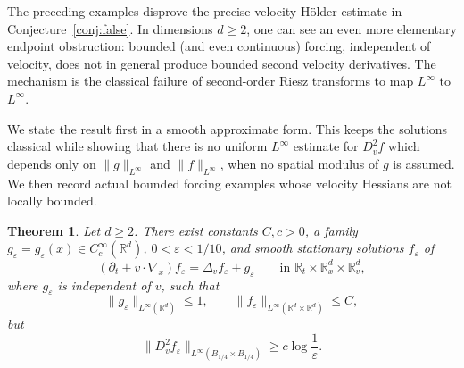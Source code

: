 \documentclass[10pt,a4paper]{amsart}
\numberwithin{equation}{section}
\newtheorem{theorem}{Theorem}[section]
\newcommand{\R}{\mathbb{R}}
\begin{document}
The preceding examples disprove the precise velocity H\"older estimate in
Conjecture~\ref{conj:false}.  In dimensions \(d\ge2\), one can see an even
more elementary endpoint obstruction: bounded {(and even continuous)} forcing, independent of
velocity, does not in general produce bounded second velocity derivatives.
The mechanism is the classical failure of second-order Riesz transforms to
map \(L^\infty\) to \(L^\infty\).

We state the result first in a smooth approximate form.  This keeps the
solutions classical while showing that {there is} no uniform \(L^\infty\) estimate for
\(D_v^2f\) {which depends} only on \(\|g\|_{L^\infty}\) and \(\|f\|_{L^\infty}\),
when no spatial modulus of \(g\) is assumed.  We then record actual bounded
forcing examples whose velocity Hessians are not locally bounded.


\begin{theorem}\label{prop:Linfty-endpoint-smooth}
Let \(d\ge2\).  There exist constants \(C,c>0\), a family
\(g_\varepsilon{=g_\varepsilon(x)}\in C_c^\infty(\R^d)\), \(0<\varepsilon<1/10\), and smooth
stationary solutions \(f_\varepsilon\) of
\begin{equation}\label{eq:Linfty-endpoint-equation}
   (\partial_t+v\cdot\nabla_x)f_\varepsilon
   =\Delta_v f_\varepsilon+g_\varepsilon
   \qquad\text{in }\R_t\times\R_x^d\times\R_v^d,
\end{equation}
where \(g_\varepsilon\) is independent of \(v\), such that
\[
   \|g_\varepsilon\|_{L^\infty(\R^d)}\le1,
   \qquad
   \|f_\varepsilon\|_{L^\infty(\R^d\times\R^d)}\le C,
\]
but
\[
   \|D_v^2f_\varepsilon\|_{L^\infty(B_{1/4}\times B_{1/4})}
   \ge c\log\frac1\varepsilon.
\]
\end{theorem}
\end{document}
